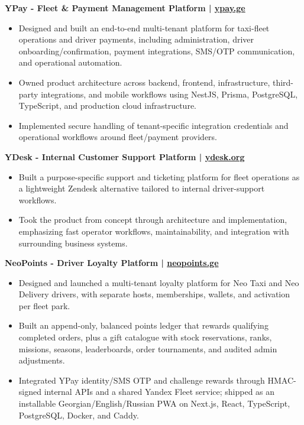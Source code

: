 \documentclass[10pt,a4paper]{article}
\newcommand{\project}[2]{%
  \needspace{4\baselineskip}%
  {\bfseries #1}\par
  \vspace{1pt}#2
}
\begin{document}
\project{YPay - Fleet \& Payment Management Platform \;|\; \href{https://ypay.ge}{ypay.ge}}{
\begin{itemize}
  \item Designed and built an end-to-end multi-tenant platform for taxi-fleet operations and driver payments, including administration, driver onboarding/confirmation, payment integrations, SMS/OTP communication, and operational automation.
  \item Owned product architecture across backend, frontend, infrastructure, third-party integrations, and mobile workflows using NestJS, Prisma, PostgreSQL, TypeScript, and production cloud infrastructure.
  \item Implemented secure handling of tenant-specific integration credentials and operational workflows around fleet/payment providers.
\end{itemize}}

\project{YDesk - Internal Customer Support Platform \;|\; \href{https://ydesk.org}{ydesk.org}}{
\begin{itemize}
  \item Built a purpose-specific support and ticketing platform for fleet operations as a lightweight Zendesk alternative tailored to internal driver-support workflows.
  \item Took the product from concept through architecture and implementation, emphasizing fast operator workflows, maintainability, and integration with surrounding business systems.
\end{itemize}}

\project{NeoPoints - Driver Loyalty Platform \;|\; \href{https://neopoints.ge}{neopoints.ge}}{
\begin{itemize}
  \item Designed and launched a multi-tenant loyalty platform for Neo Taxi and Neo Delivery drivers, with separate hosts, memberships, wallets, and activation per fleet park.
  \item Built an append-only, balanced points ledger that rewards qualifying completed orders, plus a gift catalogue with stock reservations, ranks, missions, seasons, leaderboards, order tournaments, and audited admin adjustments.
  \item Integrated YPay identity/SMS OTP and challenge rewards through HMAC-signed internal APIs and a shared Yandex Fleet service; shipped as an installable Georgian/English/Russian PWA on Next.js, React, TypeScript, PostgreSQL, Docker, and Caddy.
\end{itemize}}
\end{document}
